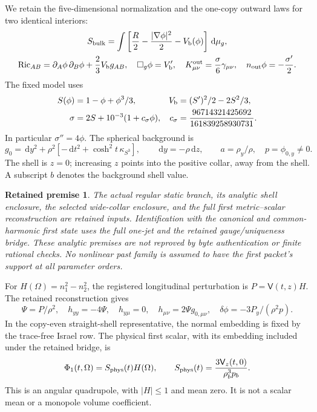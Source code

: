 \documentclass[11pt]{article}
\newcommand{\dd}{\,\mathrm d}
\newtheorem{premise}{Retained premise}
\begin{document}
We retain the five-dimensional normalization and the one-copy outward laws
for two identical interiors:
\begin{equation}
\begin{gathered}
 S_{\rm bulk}=\int\left[\frac R2-\frac{|\nabla\phi|^2}{2}
                                      -V_{\rm b}(\phi)\right]\dd\mu_g,\\
 {\rm Ric}_{AB}=\partial_A\phi\,\partial_B\phi+\frac23V_{\rm b}g_{AB},
 \quad \Box_g\phi=V_{\rm b}',\quad
 K^{\rm out}_{\mu\nu}=\frac{\sigma}{6}\gamma_{\mu\nu},
 \quad n_{\rm out}\phi=-\frac{\sigma'}2 .
\end{gathered}
\end{equation}
The fixed model uses
\begin{equation}
\begin{aligned}
 S(\phi)&=1-\phi+\phi^3/3,&V_{\rm b}&=(S')^2/2-2S^2/3,\\
 \sigma&=2S+10^{-3}(1+c_\sigma\phi),&
 c_\sigma&=\frac{96714321425692}{161839258930731}.
\end{aligned}
\end{equation}
In particular $\sigma''=4\phi$. The spherical background is
\begin{equation}
 g_0=\dd y^2+\rho^2[-\dd t^2+\cosh^2t\,\kappa_{S^3}],
 \qquad \dd y=-\rho\dd z,\qquad a=\rho_y/\rho,\quad p=\phi_{0,y}\ne0 .
 \label{eq:bg}
\end{equation}
The shell is $z=0$; increasing $z$ points into the positive collar, away
from the shell. A subscript $b$ denotes the background shell value.

\begin{premise}
The actual regular static branch, its analytic shell enclosure, the selected
wide-collar enclosure, and the full first metric--scalar reconstruction
are retained inputs. Identification with the canonical and common-harmonic
first state uses the full one-jet and the retained gauge/uniqueness bridge.
These analytic premises are not reproved by byte authentication or finite
rational checks. No nonlinear past family is assumed to have the first
packet's support at all parameter orders.
\end{premise}

For $H(\Omega)=n_1^2-n_2^2$, the registered longitudinal perturbation is
$P=\mathsf V(t,z)H$. The retained reconstruction gives
\begin{equation}
 \Psi=P/\rho^2,\quad h_{yy}=-4\Psi,\quad h_{y\mu}=0,\quad
 h_{\mu\nu}=2\Psi g_{0,\mu\nu},\quad
 \delta\phi=-3P_y/(\rho^2p).
 \label{eq:reconstruction}
\end{equation}
In the copy-even straight-shell representative, the normal embedding is
fixed by the trace-free Israel row. The physical first scalar, with its
embedding included under the retained bridge, is
\begin{equation}
 \Phi_1(t,\Omega)=S_{\rm phys}(t)H(\Omega),\qquad
 S_{\rm phys}(t)=\frac{3\mathsf V_z(t,0)}{\rho_b^3p_b}.
 \label{eq:physical}
\end{equation}
This is an angular quadrupole, with $|H|\le1$ and mean zero.
It is not a scalar mean or a monopole volume coefficient.
\end{document}
